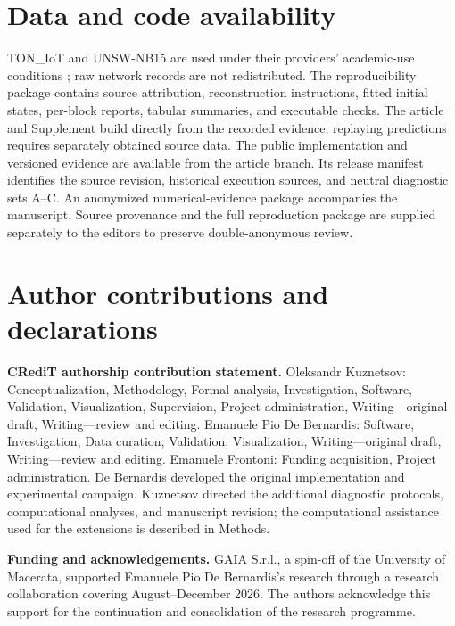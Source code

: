 \section*{Data and code availability}
TON\_IoT and UNSW-NB15 are used under their providers' academic-use conditions \citep{toniotweb,unswweb}; raw network records are not redistributed. The reproducibility package contains source attribution, reconstruction instructions, fitted initial states, per-block reports, tabular summaries, and executable checks. The article and Supplement build directly from the recorded evidence; replaying predictions requires separately obtained source data.
\ifdefined\AuthorVersion
The public implementation and versioned evidence are available from the \href{https://github.com/KuznetsovKarazin/kan-ids-v2/tree/paper2/dtrap-submission-20261102}{article branch}. Its release manifest identifies the source revision, historical execution sources, and neutral diagnostic sets A--C.
\else
An anonymized numerical-evidence package accompanies the manuscript. Source provenance and the full reproduction package are supplied separately to the editors to preserve double-anonymous review.
\fi

\ifdefined\AuthorVersion
\section*{Author contributions and declarations}
\noindent\textbf{CRediT authorship contribution statement.} Oleksandr Kuznetsov: Conceptualization, Methodology, Formal analysis, Investigation, Software, Validation, Visualization, Supervision, Project administration, Writing---original draft, Writing---review and editing. Emanuele Pio De Bernardis: Software, Investigation, Data curation, Validation, Visualization, Writing---original draft, Writing---review and editing. Emanuele Frontoni: Funding acquisition, Project administration. De Bernardis developed the original implementation and experimental campaign. Kuznetsov directed the additional diagnostic protocols, computational analyses, and manuscript revision; the computational assistance used for the extensions is described in Methods.

\noindent\textbf{Funding and acknowledgements.} GAIA S.r.l., a spin-off of the University of Macerata, supported Emanuele Pio De Bernardis's research through a research collaboration covering August--December 2026. The authors acknowledge this support for the continuation and consolidation of the research programme.

